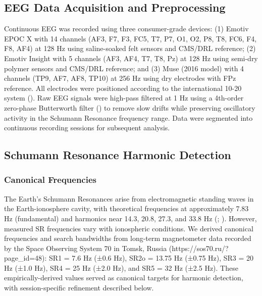 \documentclass[11pt,a4paper]{article}
\begin{document}
\subsection{EEG Data Acquisition and Preprocessing}
Continuous EEG was recorded using three consumer-grade devices: (1) Emotiv EPOC X with 14 channels (AF3, F7, F3, FC5, T7, P7, O1, O2, P8, T8, FC6, F4, F8, AF4) at 128 Hz using saline-soaked felt sensors and CMS/DRL reference; (2) Emotiv Insight with 5 channels (AF3, AF4, T7, T8, Pz) at 128 Hz using semi-dry polymer sensors and CMS/DRL reference; and (3) Muse (2016 model) with 4 channels (TP9, AF7, AF8, TP10) at 256 Hz using dry electrodes with FPz reference. All electrodes were positioned according to the international 10-20 system (\cite{jasper1958tentwenty}). Raw EEG signals were high-pass filtered at 1 Hz using a 4th-order zero-phase Butterworth filter (\cite{butterworth1930filter}) to remove slow drifts while preserving oscillatory activity in the Schumann Resonance frequency range. Data were segmented into continuous recording sessions for subsequent analysis.

\subsection{Schumann Resonance Harmonic Detection}

\subsubsection{Canonical Frequencies}
The Earth's Schumann Resonances arise from electromagnetic standing waves in the Earth-ionosphere cavity, with theoretical frequencies at approximately 7.83 Hz (fundamental) and harmonics near 14.3, 20.8, 27.3, and 33.8 Hz (\cite{schumann1952strahlungslosen}; \cite{nickolaenko2014schumann}). However, measured SR frequencies vary with ionospheric conditions. We derived canonical frequencies and search bandwidths from long-term magnetometer data recorded by the Space Observing System 70 in Tomsk, Russia (https://sos70.ru/?page\_id=48): SR1 = 7.6 Hz (±0.6 Hz), SR2o = 13.75 Hz (±0.75 Hz), SR3 = 20 Hz (±1.0 Hz), SR4 = 25 Hz (±2.0 Hz), and SR5 = 32 Hz (±2.5 Hz). These empirically-derived values served as canonical targets for harmonic detection, with session-specific refinement described below.
\end{document}
